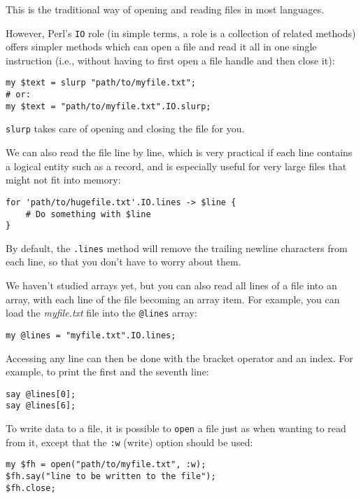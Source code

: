 This is the traditional way of opening and reading files 
in most languages.

However, Perl's {\tt IO} role (in simple terms, a role is 
a collection of related methods) offers simpler methods which 
can open a file and read it all in one single instruction (i.e., 
without having to first open a file handle and then close it):

\begin{verbatim}
my $text = slurp "path/to/myfile.txt";
# or:
my $text = "path/to/myfile.txt".IO.slurp;
\end{verbatim}
%

{\tt slurp} takes care of opening and closing the file for you.

We can also read the file line by line, which is very 
practical if each line contains a logical entity such as 
a record, and is especially useful for very large files 
that might not fit into memory:

\begin{verbatim}
for 'path/to/hugefile.txt'.IO.lines -> $line {
    # Do something with $line
}
\end{verbatim}
%
By default, the {\tt .lines} method will remove the trailing 
newline characters from each line, so that you don't have 
to worry about them.
%

We haven't studied arrays yet, but you can also read all 
lines of a file into an array, with each line of the file 
becoming an array item. For example, you can load the 
\emph{myfile.txt} file into the \verb'@lines' array:

\begin{verbatim}
my @lines = "myfile.txt".IO.lines;
\end{verbatim}
%

Accessing any line can then be done with the bracket operator 
and an index. For example, to print the first and the 
seventh line:

\begin{verbatim}
say @lines[0];
say @lines[6];
\end{verbatim}
%
To write data to a file, it is possible to {\tt open} a file just 
as when wanting to read from it, except that the {\tt :w} (write) 
option should be used:

\begin{verbatim}
my $fh = open("path/to/myfile.txt", :w);
$fh.say("line to be written to the file");
$fh.close;
\end{verbatim}

